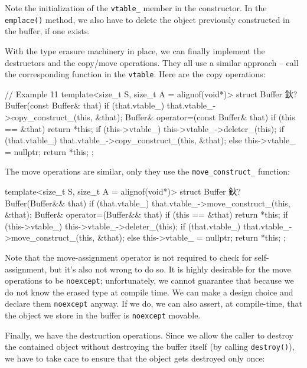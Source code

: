 Note the initialization of the \texttt{vtable\_} member in the constructor. In the \texttt{emplace()} method, we also have to delete the object previously constructed in the buffer, if one exists.

With the type erasure machinery in place, we can finally implement the destructors and the copy/move operations. They all use a similar approach -- call the corresponding function in the \texttt{vtable}. Here are the copy operations:

\begin{code}
// Example 11
template<size_t S, size_t A = alignof(void*)>
struct Buffer {
  鈥?
  Buffer(const Buffer& that) {
    if (that.vtable_)
      that.vtable_->copy_construct_(this, &that);
  }
  Buffer& operator=(const Buffer& that) {
    if (this == &that) return *this;
    if (this->vtable_) this->vtable_->deleter_(this);
    if (that.vtable_)
      that.vtable_->copy_construct_(this, &that);
    else this->vtable_ = nullptr;
    return *this;
  }
};
\end{code}

The move operations are similar, only they use the \texttt{move\_construct\_} function:

\begin{code}
template<size_t S, size_t A = alignof(void*)>
struct Buffer {
  鈥?
  Buffer(Buffer&& that) {
    if (that.vtable_)
      that.vtable_->move_construct_(this, &that);
  }
  Buffer& operator=(Buffer&& that) {
    if (this == &that) return *this;
    if (this->vtable_) this->vtable_->deleter_(this);
    if (that.vtable_)
      that.vtable_->move_construct_(this, &that);
    else this->vtable_ = nullptr;
    return *this;
  }
};
\end{code}

Note that the move-assignment operator is not required to check for self-assignment, but it's also not wrong to do so. It is highly desirable for the move operations to be \texttt{noexcept}; unfortunately, we cannot guarantee that because we do not know the erased type at compile time. We can make a design choice and declare them \texttt{noexcept} anyway. If we do, we can also assert, at compile-time, that the object we store in the buffer is \texttt{noexcept} movable.

Finally, we have the destruction operations. Since we allow the caller to destroy the contained object without destroying the buffer itself (by calling \texttt{destroy()}), we have to take care to ensure that the object gets destroyed only once:

